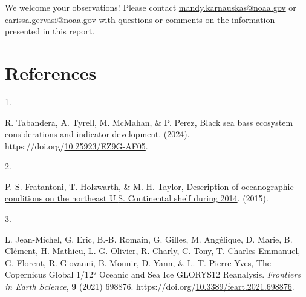 \documentclass[
  10pt,
  letterpaper,
  DIV=11,
  numbers=noendperiod]{scrartcl}
\newlength{\cslhangindent}
\newlength{\csllabelwidth}
\newenvironment{CSLReferences}[2] %
 {\begin{list}{}{%
  \setlength{\itemindent}{0pt}
  \setlength{\leftmargin}{0pt}
  \setlength{\parsep}{0pt}
  \ifodd #1
   \setlength{\leftmargin}{\cslhangindent}
   \setlength{\itemindent}{-1\cslhangindent}
  \fi
  \setlength{\itemsep}{#2\baselineskip}}}
 {\end{list}}
\newcommand{\CSLLeftMargin}[1]{\parbox[t]{\csllabelwidth}{\strut#1\strut}}
\newcommand{\CSLRightInline}[1]{\parbox[t]{\linewidth - \csllabelwidth}{\strut#1\strut}}
\begin{document}
\centering\normalsize

We welcome your observations! Please contact
\url{mandy.karnauskas@noaa.gov} or \url{carissa.gervasi@noaa.gov} with
questions or comments on the information presented in this report.

\section{References}\label{references}

\begingroup
\footnotesize

\label{refs}
\begin{CSLReferences}{0}{0}
\CSLLeftMargin{1. }%
\CSLRightInline{R. Tabandera, A. Tyrell, M. McMahan, \& P. Perez, Black
sea bass ecosystem considerations and indicator development. (2024).
https://doi.org/\href{https://doi.org/10.25923/EZ9G-AF05}{10.25923/EZ9G-AF05}.}

\CSLLeftMargin{2. }%
\CSLRightInline{P. S. Fratantoni, T. Holzwarth, \& M. H. Taylor,
\href{https://repository.library.noaa.gov/view/noaa/5047}{Description of
oceanographic conditions on the northeast {U}.{S}. Continental shelf
during 2014}. (2015).}

\CSLLeftMargin{3. }%
\CSLRightInline{L. Jean-Michel, G. Eric, B.-B. Romain, G. Gilles, M.
Angélique, D. Marie, B. Clément, H. Mathieu, L. G. Olivier, R. Charly,
C. Tony, T. Charles-Emmanuel, G. Florent, R. Giovanni, B. Mounir, D.
Yann, \& L. T. Pierre-Yves, The {Copernicus} {Global} 1/12° {Oceanic}
and {Sea} {Ice} {GLORYS12} {Reanalysis}. \emph{Frontiers in Earth
Science}, \textbf{9} (2021) 698876.
https://doi.org/\href{https://doi.org/10.3389/feart.2021.698876}{10.3389/feart.2021.698876}.}

\end{CSLReferences}

\endgroup
\end{document}
